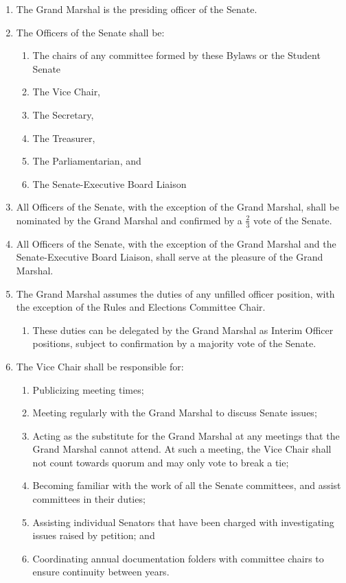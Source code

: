 
\begin{enumerate}

\item The Grand Marshal is the presiding officer of the Senate.

\item The Officers of the Senate shall be:
\begin{enumerate}
\item The chairs of any committee formed by these Bylaws or the Student Senate
\item The Vice Chair,
\item The Secretary,
\item The Treasurer,
\item The Parliamentarian, and
\item The Senate-Executive Board Liaison
\end{enumerate}

\item All Officers of the Senate, with the exception of the Grand Marshal, shall be nominated by the Grand Marshal and confirmed
by a $\frac{2}{3}$ vote of the Senate.

\item All Officers of the Senate, with the exception of the Grand Marshal and the Senate-Executive Board Liaison, shall serve at the pleasure of the Grand Marshal.

\item The Grand Marshal assumes the duties of any unfilled officer position, with the exception of the Rules and Elections
Committee Chair.
\begin{enumerate}
\item These duties can be delegated by the Grand Marshal as Interim Officer positions, subject to confirmation by a majority vote of the Senate.
\end{enumerate}

\item The Vice Chair shall be responsible for:
\begin{enumerate}
\item Publicizing meeting times;
\item Meeting regularly with the Grand Marshal to discuss Senate issues;
\item Acting as the substitute for the Grand Marshal at any meetings that the Grand Marshal cannot attend. At such a meeting, the Vice Chair shall not count towards quorum and may only vote to break a tie;
\item Becoming familiar with the work of all the Senate committees, and assist committees in their duties;
\item Assisting individual Senators that have been charged with investigating issues raised by petition; and
\item Coordinating annual documentation folders with committee chairs to ensure continuity between years.
\end{enumerate}


\end{enumerate}
